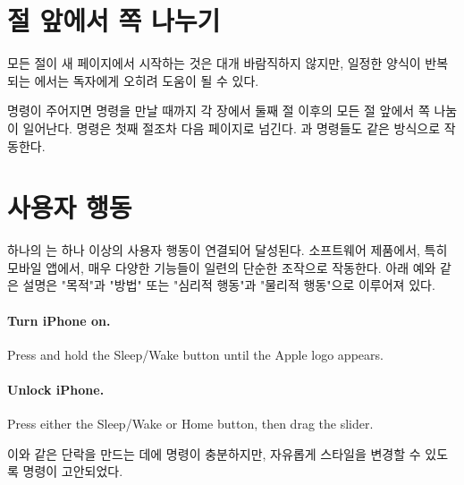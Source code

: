 \documentclass[minted]{hzguide}
\begin{document}
\section{절 앞에서 쪽 나누기}

모든 절이 새 페이지에서 시작하는 것은 대개 바람직하지 않지만, 일정한 양식이 반복되는 에서는 독자에게 오히려 도움이 될 수 있다.

\begin{code}
\SectionNewpageOn*
\SectionNewpageOff
\SubsectionNewpageOn
\SubsectionNewpageOff
\end{code}

\macro{\SectionNewpageOn} 명령이 주어지면 \macro{\SectionNewpageOff} 명령을 만날 때까지 각 장에서 둘째 절 이후의 모든 절 앞에서 쪽 나눔이 일어난다.
\macro{\SectionNewpageOn*} 명령은 첫째 절조차 다음 페이지로 넘긴다.
\macro{\SubsectionNewpageOn}과 \macro{\SubsectionNewpageOff} 명령들도 같은 방식으로 작동한다.

\section{사용자 행동}

하나의 는 하나 이상의 사용자 행동이 연결되어 달성된다.
소프트웨어 제품에서, 특히 모바일 앱에서, 매우 다양한 기능들이 일련의 단순한 조작으로 작동한다.
아래 예와 같은 설명은 "목적"과 "방법" 또는 "심리적 행동"과 "물리적 행동"으로 이루어져 있다.

\begin{example}
\vspace*{-1.5\onelineskip}
\paragraph{Turn iPhone on.} Press and hold the Sleep/Wake button until the Apple logo appears.
\paragraph{Unlock iPhone.} Press either the Sleep/Wake or Home button, then drag the slider.
\end{example}

\noindent 이와 같은 단락을 만드는 데에 \macro{\paragraph} 명령이 충분하지만, 자유롭게 스타일을 변경할 수 있도록 \macro{\action} 명령이 고안되었다.
\end{document}
